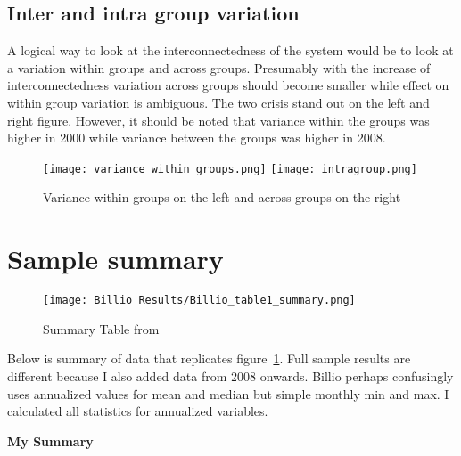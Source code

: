 \documentclass[preprint,pre,floats,aps,amsmath,amssymb]{revtex4}
\begin{document}
\subsection{Inter and intra group variation}

A logical way to look at the interconnectedness of the system would be to look at a variation within groups and across groups. Presumably with the increase of interconnectedness variation across groups should become smaller while effect on within group variation is ambiguous. The two crisis stand out on the left and right figure. However, it should be noted that variance within the groups was higher in 2000 while variance between the groups was higher in 2008. 

\begin{figure}[ht]
\texttt{[image: variance within groups.png]}
\texttt{[image: intragroup.png]}

\caption{Variance within groups on the left and across groups on the right }
\end{figure}





\cleardoublepage
\appendix*

\section{Sample summary}

\begin{figure}[t]
\texttt{[image: Billio Results/Billio\_table1\_summary.png]}
\caption{Summary Table from \cite{billio}}
\label{fig:billiosummary}
\end{figure}

\indent
Below is summary of data that replicates figure~\ref{fig:billiosummary}. Full sample results are different because I also added data from 2008 onwards. Billio perhaps confusingly uses annualized values for mean and median but simple monthly min and max. I calculated all statistics for annualized variables. 



\clearpage
{\centering\textbf{My Summary}\par}







\clearpage
\par
\end{document}
